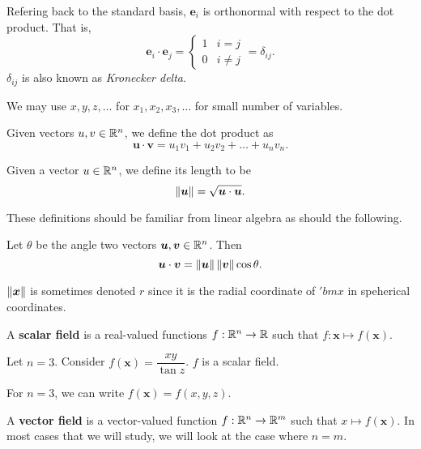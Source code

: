 Refering back to the standard basis, $\bm e_i$ is orthonormal with respect to the dot product. That is, \[ \bm e_i \cdot \bm e_j = \begin{cases} 1 & i = j \\ 0 & i \neq j \end{cases} = \delta_{ij}. \] $\delta_{ij}$ is also known as \emph{Kronecker delta}.

We may use $x, y, z, \ldots$ for $x_1, x_2, x_3, \ldots$ for small number of variables.

\begin{definition}
    Given vectors $u, v \in \mathbb{R}^n$, we define the dot product as \[ \bm u \cdot \bm v = u_1v_1 + u_2v_2 + \ldots + u_nv_n. \] 
\end{definition}

\begin{definition}
    Given a vector $u \in \mathbb{R}^n$, we define its length to be \[ \left\lVert\bm u\right\rVert = \sqrt{\bm u \cdot \bm u}. \]
\end{definition}

These definitions should be familiar from linear algebra as should the following.

\begin{definition}
    Let $\theta$ be the angle two vectors $\bm u, \bm v \in \mathbb{R}^n$. Then \[ \bm u \cdot \bm v = \left\lVert\bm u\right\rVert \left\lVert\bm v\right\rVert \cos{\theta}. \]
\end{definition}

\begin{remark}
    $\left\lVert\bm x\right\rVert$ is sometimes denoted $r$ since it is the radial coordinate of $'bm x$ in speherical coordinates.
\end{remark}

\begin{definition}
    A \textbf{scalar field} is a real-valued functions $f : \mathbb{R}^n \to \mathbb{R}$ such that $f: \bm x \mapsto f(\bm x)$.
\end{definition}

\begin{example}
    Let $n = 3$. Consider $f(\bm x) = \dfrac{xy}{\tan{z}}$. $f$ is a scalar field.
\end{example}

\begin{remark}
    For $n = 3$, we can write $f(\bm x) = f(x, y, z)$.
\end{remark}

\begin{definition}
    A \textbf{vector field} is a vector-valued function $f : \mathbb{R}^n \to \mathbb{R}^m$ such that $x \mapsto f(\bm x)$. In most cases that we will study, we will look at the case where $n = m$.
\end{definition}

